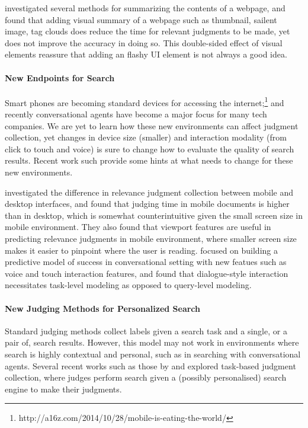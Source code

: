 \cite{al2010evaluating} investigated several methods for summarizing the contents of a webpage, and found that adding visual summary of a webpage such as thumbnail, sailent image, tag clouds does reduce the time for relevant judgments to be made, yet does not improve the accuracy in doing so. This double-sided effect of visual elements reassure that adding an flashy UI element is not always a good idea.

\paragraph{New Endpoints for Search} Smart phones are becoming standard devices for accessing the internet;\footnote{http://a16z.com/2014/10/28/mobile-is-eating-the-world/} and recently conversational agents have become a major focus for many tech companies. We are yet to learn how these new environments can affect judgment collection, yet changes in device size (smaller) and interaction modality (from click to touch and voice) is sure to change how to evaluate the quality of search results. Recent work such  provide some hints at what needs to change for these new environments. 

\cite{VermaY16} investigated the difference in relevance judgment collection between mobile and desktop interfaces, and found that judging time in mobile documents is higher than in desktop, which is somewhat counterintuitive given the small screen size in mobile environment. They also found that viewport features are useful in predicting relevance judgments in mobile environment, where smaller screen size makes it easier to pinpoint where the user is reading. \cite{Kiseleva:2016} focused on building a predictive model of success in conversational setting with new featues such as voice and touch interaction features, and found that dialogue-style interaction necessitates task-level modeling as opposed to query-level modeling.
 

\paragraph{New Judging Methods for Personalized Search} Standard judging methods collect labels given a search task and a single, or a pair of, search results. However, this model may not work in environments where search is highly contextual and personal, such as in searching with conversational agents. Several recent works such as  those by \cite{Xu:2009} and \cite{Moraveji:2011} explored task-based judgment collection, where judges perform search given a (possibly personalised) search engine to make their judgments. 

